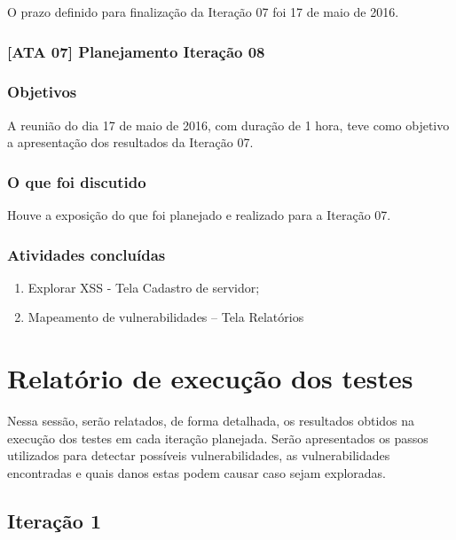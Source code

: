 \documentclass[
    12pt,               %
    openright,          %
    oneside,            %
    a4paper,            %
    section=TITLE,     %
    english,            %
    french,             %
    spanish,            %
    brazil              %
    ]{abntex2}
\begin{document}
O prazo definido para finalização da Iteração 07 foi 17 de maio de 2016.



\subsubsection*{{[}ATA 07{]} Planejamento Iteração 08}


\subsubsection*{Objetivos}

A reunião do dia 17 de maio de 2016, com duração de 1 hora, teve como objetivo a apresentação dos resultados da Iteração 07.



\subsubsection*{O que foi discutido}

Houve a exposição do que foi planejado e realizado para a Iteração 07.



\subsubsection*{Atividades concluídas}


\begin{enumerate}[start=1]
	
\item Explorar XSS - Tela Cadastro de servidor;
	
\item Mapeamento de vulnerabilidades -- Tela Relatórios

\end{enumerate}


\section{Relatório de execução dos testes}

Nessa sessão, serão relatados, de forma detalhada, os resultados obtidos na execução dos testes em cada iteração planejada. Serão apresentados os passos utilizados para detectar possíveis vulnerabilidades, as vulnerabilidades encontradas e quais danos estas podem causar caso sejam exploradas.



\subsection{Iteração 1}
\end{document}
